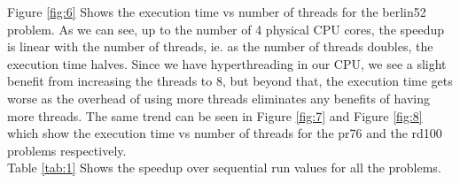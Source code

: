 \documentclass[10pt,journal,compsoc]{IEEEtran}
\begin{document}
Figure \ref{fig:6} Shows the execution time vs number of threads for the berlin52 problem. As we can see, up to the number of 4 physical CPU cores, the speedup is linear with the number of threads, ie. as the number of threads doubles, the execution time halves. Since we have hyperthreading in our CPU, we see a slight benefit from increasing the threads to 8, but beyond that, the execution time gets worse as the overhead of using more threads eliminates any benefits of having more threads. The same trend can be seen in Figure \ref{fig:7} and Figure \ref{fig:8} which show the execution time vs number of threads for the pr76 and the rd100 problems respectively.\\
Table \ref{tab:1} Shows the speedup over sequential run values for all the problems.

\begin{table}[ht]
    \centering
    \caption{Speedup of multithreading over sequential run}
    \label{tab:1}
\end{table}
\end{document}
